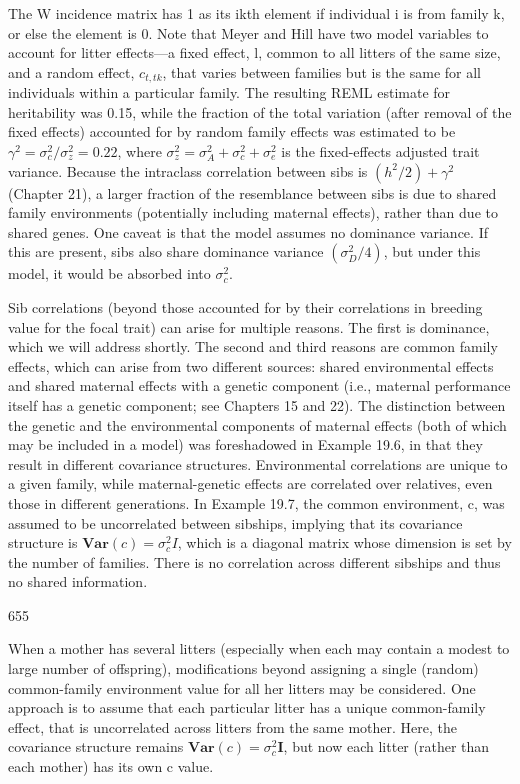 \documentclass{article}
\begin{document}
The W incidence matrix has 1 as its ikth element if individual i is from family k, or else the element is 0. Note that Meyer and Hill have two model variables to account for litter effects—a fixed effect, l, common to all litters of the same size, and a random effect,  $ c_{t,tk} $, that varies between families but is the same for all individuals within a particular family. The resulting REML estimate for heritability was 0.15, while the fraction of the total variation (after removal of the fixed effects) accounted for by random family effects was estimated to be  $ \gamma^2 = \sigma_c^2 / \sigma_z^2 = 0.22 $, where  $ \sigma_z^2 = \sigma_A^2 + \sigma_c^2 + \sigma_e^2 $ is the fixed-effects adjusted trait variance. Because the intraclass correlation between sibs is  $ (h^2 / 2) + \gamma^2 $ (Chapter 21), a larger fraction of the resemblance between sibs is due to shared family environments (potentially including maternal effects), rather than due to shared genes. One caveat is that the model assumes no dominance variance. If this are present, sibs also share dominance variance  $ (\sigma_D^2 / 4) $, but under this model, it would be absorbed into  $ \sigma_c^2 $.

Sib correlations (beyond those accounted for by their correlations in breeding value for the focal trait) can arise for multiple reasons. The first is dominance, which we will address shortly. The second and third reasons are common family effects, which can arise from two different sources: shared environmental effects and shared maternal effects with a genetic component (i.e., maternal performance itself has a genetic component; see Chapters 15 and 22). The distinction between the genetic and the environmental components of maternal effects (both of which may be included in a model) was foreshadowed in Example 19.6, in that they result in different covariance structures. Environmental correlations are unique to a given family, while maternal-genetic effects are correlated over relatives, even those in different generations. In Example 19.7, the common environment, c, was assumed to be uncorrelated between sibships, implying that its covariance structure is  $ \mathbf{Var}(c) = \sigma_c^2 I $, which is a diagonal matrix whose dimension is set by the number of families. There is no correlation across different sibships and thus no shared information.

655

When a mother has several litters (especially when each may contain a modest to large number of offspring), modifications beyond assigning a single (random) common-family environment value for all her litters may be considered. One approach is to assume that each particular litter has a unique common-family effect, that is uncorrelated across litters from the same mother. Here, the covariance structure remains  $ \mathbf{Var}(c) = \sigma_c^2 \mathbf{I} $, but now each litter (rather than each mother) has its own c value.
\end{document}

